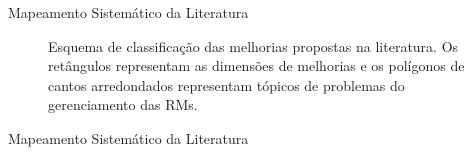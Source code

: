 \documentclass[t,14pt,mathserif]{beamer}
\begin{document}
\begin{frame}{Mapeamento Sistemático da Literatura}

    \begin{figure}[tb] \centering
        \caption{Esquema de classificação das melhorias propostas na literatura.
            Os retângulos representam as dimensões de melhorias e os polígonos
            de cantos arredondados representam tópicos de problemas do
            gerenciamento das RMs.}\label{fig:diagrama-esquema-dimensao-melhorias}
    \end{figure}
\end{frame}

\begin{frame}{Mapeamento Sistemático da Literatura}

    \begin{table}[htpb]
    \centering
    \caption{Total de artigos por papel na manutenção de software}
\label{tab:graf_papel_por_artigo}
    \end{table}

\end{frame}
\end{document}
